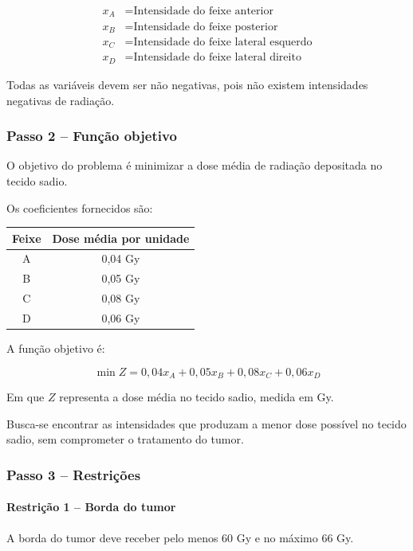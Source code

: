 \documentclass[12pt,a4paper]{article}
\begin{document}
\begin{align*}
x_A &= \text{Intensidade do feixe anterior} \\
x_B &= \text{Intensidade do feixe posterior} \\
x_C &= \text{Intensidade do feixe lateral esquerdo} \\
x_D &= \text{Intensidade do feixe lateral direito}
\end{align*}

Todas as variáveis devem ser não negativas,
pois não existem intensidades negativas de radiação.

\subsubsection*{Passo 2 -- Função objetivo}

O objetivo do problema é minimizar a dose média
de radiação depositada no tecido sadio.

Os coeficientes fornecidos são:

\begin{center}
\begin{tabular}{cc}
\toprule
\textbf{Feixe} & \textbf{Dose média por unidade} \\
\midrule
A & 0,04 Gy \\
B & 0,05 Gy \\
C & 0,08 Gy \\
D & 0,06 Gy \\
\bottomrule
\end{tabular}
\end{center}

A função objetivo é:

\[
\boxed{
\min Z =
0{,}04x_A + 0{,}05x_B +
0{,}08x_C + 0{,}06x_D
}
\]

Em que $Z$ representa a dose média
no tecido sadio, medida em Gy.

Busca-se encontrar as intensidades que produzam
a menor dose possível no tecido sadio,
sem comprometer o tratamento do tumor.

\subsubsection*{Passo 3 -- Restrições}

\paragraph{Restrição 1 -- Borda do tumor}

A borda do tumor deve receber pelo menos
60 Gy e no máximo 66 Gy.
\end{document}
